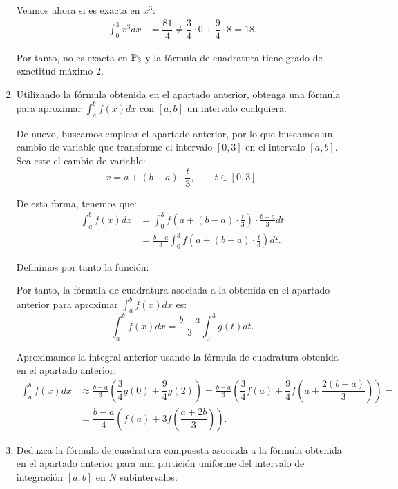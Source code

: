 \begin{ejercicio}
\begin{enumerate}
        Veamos ahora si es exacta en $x^3$:
        \begin{align*}
            \int_{0}^{3} x^3 dx &= \dfrac{81}{4} \neq \dfrac{3}{4}\cdot 0 + \dfrac{9}{4}\cdot 8 = 18.
        \end{align*}

        Por tanto, no es exacta en $\mathbb{P}_3$ y la fórmula de cuadratura tiene grado de exactitud máximo $2$.

        \item Utilizando la fórmula obtenida en el apartado anterior, obtenga una fórmula para aproximar $\int_{a}^{b} f(x) dx$ con $[a, b]$ un intervalo cualquiera.
        
        De nuevo, buscamos emplear el apartado anterior, por lo que buscamos un cambio de variable que transforme el intervalo $[0,3]$ en el intervalo $[a,b]$. Sea este el cambio de variable:
        \begin{equation*}
            x = a + (b-a)\cdot \frac{t}{3}, \qquad t\in [0,3].
        \end{equation*}

        De esta forma, tenemos que:
        \begin{align*}
            \int_{a}^{b} f(x) dx &= \int_{0}^{3} f\left(a + (b-a)\cdot \frac{t}{3}\right) \cdot \frac{b-a}{3} dt\\
            &= \frac{b-a}{3}\int_{0}^{3} f\left(a + (b-a)\cdot \frac{t}{3}\right) dt.
        \end{align*}

        Definimos por tanto la función:

        Por tanto, la fórmula de cuadratura asociada a la obtenida en el apartado anterior para aproximar $\int_{a}^{b} f(x) dx$ es:
        \begin{equation*}
            \int_{a}^{b} f(x) dx = \frac{b-a}{3}\int_{0}^{3} g(t) dt.
        \end{equation*}

        Aproximamos la integral anterior usando la fórmula de cuadratura obtenida en el apartado anterior:
        \begin{align*}
            \int_{a}^{b} f(x) dx &\approx \frac{b-a}{3}\left(\dfrac{3}{4}g(0) + \dfrac{9}{4}g(2)\right)
            = \frac{b-a}{3}\left(\dfrac{3}{4}f(a) + \dfrac{9}{4}f\left(a + \dfrac{2(b-a)}{3}\right)\right)
            =\\&= \dfrac{b-a}{4}\left(f(a) + 3f\left(\dfrac{a + 2b}{3}\right)\right).
        \end{align*}
        \item Deduzca la fórmula de cuadratura compuesta asociada a la fórmula obtenida en el apartado anterior para una partición uniforme del intervalo de integración $[a, b]$ en $N$ subintervalos.
        

\end{enumerate}
\end{ejercicio}
